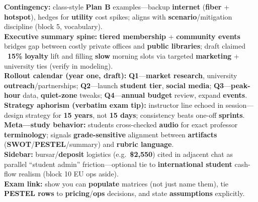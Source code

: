 \documentclass[10pt,a4paper]{article}
\begin{document}
{\textbf{Contingency:} class-style \textbf{Plan B} examples---backup \textbf{internet} (\textbf{fiber} + \textbf{hotspot}), hedges for \textbf{utility} cost spikes; aligns with \textbf{scenario}/mitigation discipline (block 5, vocabulary).\\
\textbf{Executive summary spine:} \textbf{tiered membership} + \textbf{community events} bridges gap between costly private offices and \textbf{public libraries}; draft claimed ~\textbf{15\%} \textbf{loyalty} lift and filling \textbf{slow} morning slots via targeted \textbf{marketing} + university ties (verify in modeling).\\
\textbf{Rollout calendar (year one, draft):} \textbf{Q1}---\textbf{market research}, university \textbf{outreach}/partnerships; \textbf{Q2}---launch \textbf{student tier}, \textbf{social media}; \textbf{Q3}---\textbf{peak-hour} data, \textbf{quiet-zone} tweaks; \textbf{Q4}---\textbf{annual budget} review, expand \textbf{events}.\\
\textbf{Strategy aphorism (verbatim exam tip):} instructor line echoed in session---design strategy for \textbf{15 years}, not \textbf{15 days}; consistency beats one-off \textbf{sprints}.\\
\textbf{Meta---study behavior:} students cross-checked \textbf{audio} for exact professor \textbf{terminology}; signals \textbf{grade-sensitive} alignment between \textbf{artifacts} (\textbf{SWOT}/\textbf{PESTEL}/summary) and \textbf{rubric language}.\\
\textbf{Sidebar:} bursar/\textbf{deposit} logistics (e.g.\ \textbf{\$2{,}550}) cited in adjacent chat as parallel ``student admin'' friction---optional tie to \textbf{international student} cash-flow realism (block 10 EU ops aside).\\
\textbf{Exam link:} show you can \textbf{populate} matrices (not just name them), tie \textbf{PESTEL rows} to \textbf{pricing}/\textbf{ops} decisions, and state \textbf{assumptions} explicitly.
}
\end{document}
